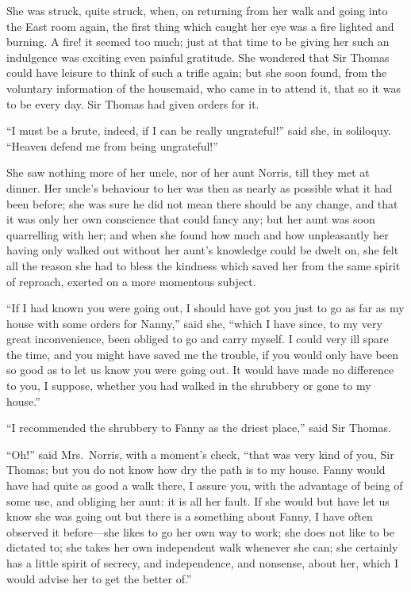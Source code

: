 She was struck, quite struck, when, on returning from her
walk and going into the East room again, the first thing
which caught her eye was a fire lighted and burning.
A fire! it seemed too much; just at that time to be giving
her such an indulgence was exciting even painful gratitude.
She wondered that Sir Thomas could have leisure to think
of such a trifle again; but she soon found, from the voluntary
information of the housemaid, who came in to attend it,
that so it was to be every day.  Sir Thomas had given
orders for it.

``I must be a brute, indeed, if I can be really ungrateful!''
said she, in soliloquy.  ``Heaven defend me from
being ungrateful!''

She saw nothing more of her uncle, nor of her aunt Norris,
till they met at dinner.  Her uncle's behaviour to her
was then as nearly as possible what it had been before;
she was sure he did not mean there should be any change,
and that it was only her own conscience that could fancy any;
but her aunt was soon quarrelling with her; and when she
found how much and how unpleasantly her having only walked
out without her aunt's knowledge could be dwelt on,
she felt all the reason she had to bless the kindness
which saved her from the same spirit of reproach,
exerted on a more momentous subject.

``If I had known you were going out, I should have got you
just to go as far as my house with some orders for Nanny,''
said she, ``which I have since, to my very great inconvenience,
been obliged to go and carry myself.  I could very ill
spare the time, and you might have saved me the trouble,
if you would only have been so good as to let us know you
were going out.  It would have made no difference to you,
I suppose, whether you had walked in the shrubbery or gone
to my house.''

``I recommended the shrubbery to Fanny as the driest place,''
said Sir Thomas.

``Oh!'' said Mrs.\ Norris, with a moment's check,
``that was very kind of you, Sir Thomas; but you do not
know how dry the path is to my house.  Fanny would have
had quite as good a walk there, I assure you, with the
advantage of being of some use, and obliging her aunt:
it is all her fault.  If she would but have let us know
she was going out but there is a something about Fanny,
I have often observed it before---she likes to go her
own way to work; she does not like to be dictated to;
she takes her own independent walk whenever she can;
she certainly has a little spirit of secrecy, and independence,
and nonsense, about her, which I would advise her to get
the better of.''

